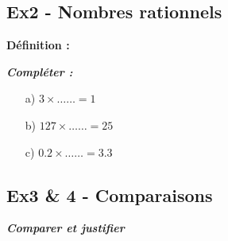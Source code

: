 \documentclass[11pt]{article}
\begin{document}
\subsection*{Ex2 - Nombres rationnels}

\textbf{Définition :} \dotfill

\textit{\textbf{Compléter :}}

\begin{multicols}{3}

  \begin{enumerate}
  \item[a)] $ 3 \times \ldots \ldots = 1$
  \item[b)] $ 127 \times \ldots \ldots = 25$
  \item[c)] $ 0.2 \times \ldots \ldots = 3.3$
  \end{enumerate}

\end{multicols}

\subsection*{Ex3 \& 4 - Comparaisons}
\textit{\textbf{Comparer et justifier}}
\end{document}
